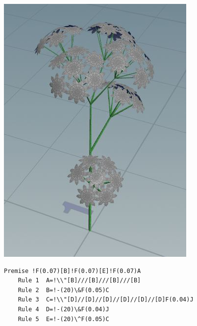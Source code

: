 \begin{​itemize}
\includegraphics*[width=\textwidth]{graphics/flowerone1.JPG}
\begin{lstlisting}[caption={Flower One}]
	Premise !F(0.07)[B]!F(0.07)[E]!F(0.07)A
	Rule 1	A=!\\"[B]///[B]///[B]///[B]
	Rule 2	B=!-(20)\&F(0.05)C
	Rule 3	C=!\\"[D]//[D]//[D]//[D]//[D]//[D]F(0.04)J
	Rule 4	D=!-(20)\&F(0.04)J
	Rule 5	E=!-(20)\^F(0.05)C
\end{lstlisting} 

\end{​itemize}
